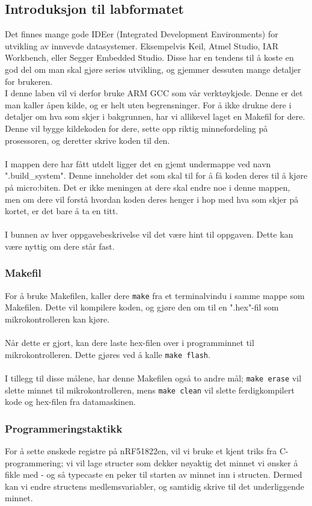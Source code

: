 \documentclass[11pt,a4paper]{article}
\begin{document}
\subsection{Introduksjon til labformatet}
Det finnes mange gode IDEer (Integrated Development Environments) for utvikling av innvevde datasystemer. Eksempelvis Keil, Atmel Studio, IAR Workbench, eller Segger Embedded Studio. Disse har en tendens til å koste en god del om man skal gjøre seriøs utvikling, og gjemmer dessuten mange detaljer for brukeren.\\
I denne laben vil vi derfor bruke ARM GCC som vår verktøykjede. Denne er det man kaller åpen kilde, og er helt uten begrensninger. For å ikke drukne dere i detaljer om hva som skjer i bakgrunnen, har vi allikevel laget en Makefil for dere. Denne vil bygge kildekoden for dere, sette opp riktig minnefordeling på prosessoren, og deretter skrive koden til den.\\
\\
I mappen dere har fått utdelt ligger det en gjemt undermappe ved navn ".build\_system". Denne inneholder det som skal til for å få koden deres til å kjøre på micro:biten. Det er ikke meningen at dere skal endre noe i denne mappen, men om dere vil forstå hvordan koden deres henger i hop med hva som skjer på kortet, er det bare å ta en titt.\\
\\
I bunnen av hver oppgavebeskrivelse vil det være hint til oppgaven. Dette kan være nyttig om dere står fast.

\subsubsection{Makefil}
For å bruke Makefilen, kaller dere \texttt{make} fra et terminalvindu i samme mappe som Makefilen. Dette vil kompilere koden, og gjøre den om til en ".hex"-fil som mikrokontrolleren kan kjøre.\\
\\
Når dette er gjort, kan dere laste hex-filen over i programminnet til mikrokontrolleren. Dette gjøres ved å kalle \texttt{make flash}.\\
\\
I tillegg til disse målene, har denne Makefilen også to andre mål; \texttt{make erase} vil slette minnet til mikrokontrolleren, mens \texttt{make clean} vil slette ferdigkompilert kode og hex-filen fra datamaskinen.


\subsubsection{Programmeringstaktikk}
For å sette ønskede registre på nRF51822en, vil vi bruke et kjent triks fra C-programmering; vi vil lage structer som dekker nøyaktig det minnet vi ønsker å fikle med - og så typecaste en peker til starten av minnet inn i structen. Dermed kan vi endre structens medlemsvariabler, og samtidig skrive til det underliggende minnet.
\end{document}
